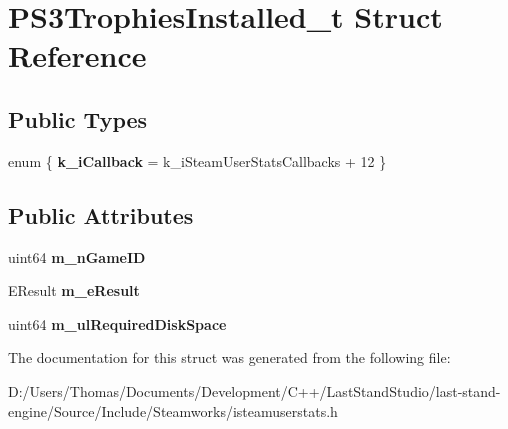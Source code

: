 \hypertarget{structPS3TrophiesInstalled__t}{}\section{P\+S3\+Trophies\+Installed\+\_\+t Struct Reference}
\label{structPS3TrophiesInstalled__t}
\subsection*{Public Types}
\begin{DoxyCompactItemize}
\item 
\hypertarget{structPS3TrophiesInstalled__t_a8d0f034d7dd2c15022c54b202db4a894}{}enum \{ {\bfseries k\+\_\+i\+Callback} = k\+\_\+i\+Steam\+User\+Stats\+Callbacks + 12
 \}\label{structPS3TrophiesInstalled__t_a8d0f034d7dd2c15022c54b202db4a894}

\end{DoxyCompactItemize}
\subsection*{Public Attributes}
\begin{DoxyCompactItemize}
\item 
\hypertarget{structPS3TrophiesInstalled__t_a8f40f832891bdd1534d8127a578d93b7}{}uint64 {\bfseries m\+\_\+n\+Game\+I\+D}\label{structPS3TrophiesInstalled__t_a8f40f832891bdd1534d8127a578d93b7}

\item 
\hypertarget{structPS3TrophiesInstalled__t_af1d76496b91526fc17bcb405b223fd5c}{}E\+Result {\bfseries m\+\_\+e\+Result}\label{structPS3TrophiesInstalled__t_af1d76496b91526fc17bcb405b223fd5c}

\item 
\hypertarget{structPS3TrophiesInstalled__t_ae0a6172acff00609cc2ef3465e22bdb9}{}uint64 {\bfseries m\+\_\+ul\+Required\+Disk\+Space}\label{structPS3TrophiesInstalled__t_ae0a6172acff00609cc2ef3465e22bdb9}

\end{DoxyCompactItemize}


The documentation for this struct was generated from the following file\+:\begin{DoxyCompactItemize}
\item 
D\+:/\+Users/\+Thomas/\+Documents/\+Development/\+C++/\+Last\+Stand\+Studio/last-\/stand-\/engine/\+Source/\+Include/\+Steamworks/isteamuserstats.\+h\end{DoxyCompactItemize}
